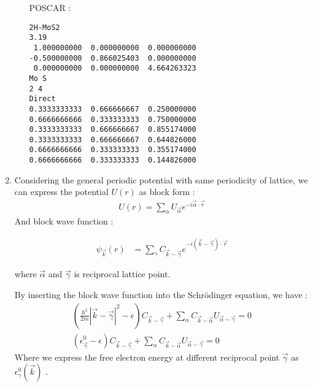 \documentclass[notitlepage]{revtex4-1}
\begin{document}
\begin{CJK}{UTF8}{bsmi}
\begin{enumerate}
\begin{enumerate}[label=(\alph*)]
			POSCAR :
\begin{lstlisting}
2H-MoS2
3.19
 1.000000000  0.000000000  0.000000000
-0.500000000  0.866025403  0.000000000
 0.000000000  0.000000000  4.664263323
Mo S
2 4
Direct
0.3333333333  0.666666667  0.250000000
0.6666666666  0.333333333  0.750000000
0.3333333333  0.666666667  0.855174000
0.3333333333  0.666666667  0.644826000
0.6666666666  0.333333333  0.355174000
0.6666666666  0.333333333  0.144826000
\end{lstlisting}			
		\end{enumerate}
	\newpage
	\item Considering the general periodic potential with same periodicity of lattice, we can express the potential $U(r)$ as block form :
	\begin{align*}
		U(r) = \sum_{\alpha} U_{\vec{\alpha}} e^{-i\vec{\alpha} \cdot \vec{r}} 
	\end{align*} 
	And block wave function :
	
	\begin{align*}
	\psi_{\vec{k}}(r) &= \sum_{\gamma}C_{\vec{k}-\vec{\gamma}} e^{-i(\vec{k}-\vec{\gamma}) \cdot \vec{r}}
	\end{align*}
	
	where $\vec{\alpha}$ and $\vec{\gamma}$ is reciprocal lattice point. 

	By inserting the block wave function into the Schrödinger equation, we have :
	\begin{align*}
		\left( \frac{\hbar^2}{2m} |\vec{k} - \vec{\gamma}|^2 - 	\epsilon \right) C_{\vec{k} - \vec{\gamma}} + \sum_{\alpha} C_{\vec{k}-\vec{\alpha}} U_{\vec{\alpha}-\vec{\gamma}} = 0 \\
		\left( \epsilon^{0}_{\vec{\gamma}} - 	\epsilon \right) C_{\vec{k} - \vec{\gamma}} + \sum_{\alpha} C_{\vec{k}-\vec{\alpha}} U_{\vec{\alpha}-\vec{\gamma}} = 0
	\end{align*} 
	Where we express the free electron energy at different reciprocal point $\vec{\gamma}$ as $\epsilon^{0}_{\gamma}(\vec{k})$ . 
	

\end{enumerate}
\end{CJK}
\end{document}
